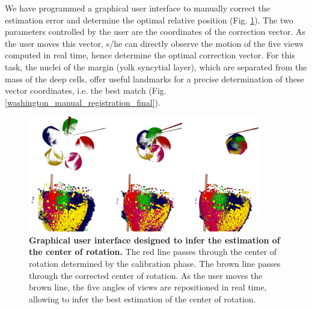    We have programmed a graphical user interface to manually correct the estimation error and determine the optimal relative position (Fig. \ref{washington_manual_registration_selection}). The two parameters controlled by the user are the coordinates of the correction vector. As the user moves this vector, s/he can directly observe the motion of the five views computed in real time, hence determine the optimal correction vector. For this task, the nuclei of the margin (yolk syncytial layer), which are separated from the mass of the deep cells, offer useful landmarks for a precise determination of these vector coordinates, i.e. the best match (Fig. \ref{washington_manual_registration_final}).  
\begin{figure}
\begin{center}
\includegraphics[width=0.9\textwidth]{../../images/Reconstruction/washington/manual_registration_selection.png}
\end{center}
\caption{\textbf{Graphical user interface designed to infer the estimation of the center of rotation.} The red line passes through the center of rotation determined by the calibration phase. The brown line passes through the corrected center of rotation. As the user moves the brown line, the five angles of views are repositioned in real time, allowing to infer the best estimation of the center of rotation.}
\label{washington_manual_registration_selection}
\end{figure}
